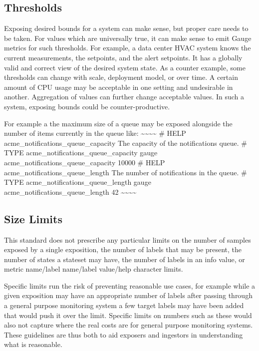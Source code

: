 \documentclass[a4paper,12pt,notitlepage,twoside,openright]{article}
\begin{document}
\hypertarget{thresholds}{%
\subsection{Thresholds}\label{thresholds}}

Exposing desired bounds for a system can make sense, but proper care
needs to be taken. For values which are universally true, it can make
sense to emit Gauge metrics for such thresholds. For example, a data
center HVAC system knows the current measurements, the setpoints, and
the alert setpoints. It has a globally valid and correct view of the
desired system state. As a counter example, some thresholds can change
with scale, deployment model, or over time. A certain amount of CPU
usage may be acceptable in one setting and undesirable in another.
Aggregation of values can further change acceptable values. In such a
system, exposing bounds could be counter-productive.

For example a the maximum size of a queue may be exposed alongside the
number of items currently in the queue like:
\textasciitilde\textasciitilde\textasciitilde\textasciitilde{} \# HELP
acme\_notifications\_queue\_capacity The capacity of the notifications
queue. \# TYPE acme\_notifications\_queue\_capacity gauge
acme\_notifications\_queue\_capacity 10000 \# HELP
acme\_notifications\_queue\_length The number of notifications in the
queue. \# TYPE acme\_notifications\_queue\_length gauge
acme\_notifications\_queue\_length 42
\textasciitilde\textasciitilde\textasciitilde\textasciitilde{}

\hypertarget{size-limits}{%
\subsection{Size Limits}\label{size-limits}}

This standard does not prescribe any particular limits on the number of
samples exposed by a single exposition, the number of labels that may be
present, the number of states a stateset may have, the number of labels
in an info value, or metric name/label name/label value/help character
limits.

Specific limits run the risk of preventing reasonable use cases, for
example while a given exposition may have an appropriate number of
labels after passing through a general purpose monitoring system a few
target labels may have been added that would push it over the limit.
Specific limits on numbers such as these would also not capture where
the real costs are for general purpose monitoring systems. These
guidelines are thus both to aid exposers and ingestors in understanding
what is reasonable.
\end{document}
